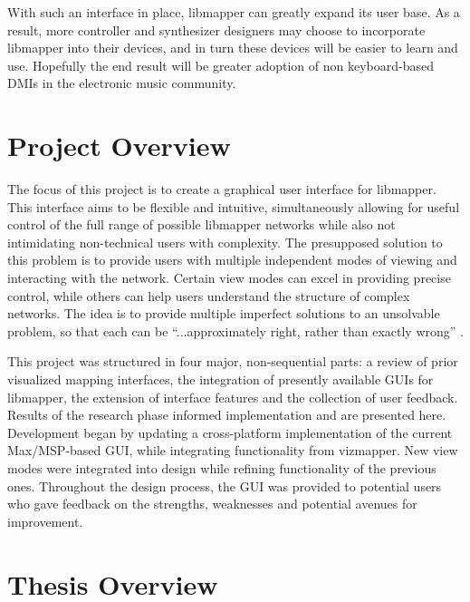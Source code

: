 With such an interface in place, libmapper can greatly expand its user base. As a result, more controller and synthesizer designers may choose to incorporate libmapper into their devices, and in turn these devices will be easier to learn and use. Hopefully the end result will be greater adoption of non keyboard-based DMIs in the electronic music community.


\section{Project Overview}

The focus of this project is to create a graphical user interface for libmapper. This interface aims to be flexible and intuitive, simultaneously allowing for useful control of the full range of possible libmapper networks while also not intimidating non-technical users with complexity. The presupposed solution to this problem is to provide users with multiple independent modes of viewing and interacting with the network. Certain view modes can excel in providing precise control, while others can help users understand the structure of complex networks. The idea is to provide multiple imperfect solutions to an unsolvable problem, so that each can be ``...approximately right, rather than exactly wrong'' .

This project was structured in four major, non-sequential parts: a review of prior visualized mapping interfaces, the integration of presently available GUIs for libmapper, the extension of interface features and the collection of user feedback. Results of the research phase informed implementation and are presented here. Development began by updating a cross-platform implementation of the current Max/MSP-based GUI, while integrating functionality from vizmapper. New view modes were integrated into design while refining functionality of the previous ones. Throughout the design process, the GUI was provided to potential users who gave feedback on the strengths, weaknesses and potential avenues for improvement.

\section{Thesis Overview}

